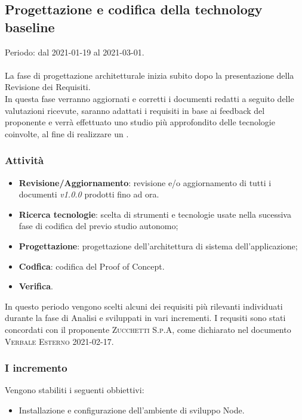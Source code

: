 \documentclass[../piano_di_progetto.tex]{subfiles}
\begin{document}
\subsection{Progettazione e codifica della technology baseline}
\label{sub:tech_baseline}
Periodo: dal 2021-01-19 al 2021-03-01. \\ \\
La fase di progettazione architetturale inizia subito dopo la presentazione della Revisione dei Requisiti.\\
In questa fase verranno aggiornati e corretti i documenti redatti a seguito delle valutazioni ricevute, saranno adattati i requisiti in base ai feedback del proponente e verrà effettuato uno studio più approfondito delle tecnologie coinvolte, al fine di realizzare un .

\subsubsection{Attività}
\begin{itemize}
    \item \textbf{Revisione/Aggiornamento}: revisione e/o aggiornamento di tutti i documenti \emph{v1.0.0} prodotti fino ad ora.
    \item \textbf{Ricerca tecnologie}: scelta di strumenti e tecnologie usate nella sucessiva fase di codifica del  previo studio autonomo;
    \item \textbf{Progettazione}: progettazione dell'architettura di sistema dell'applicazione;
    \item \textbf{Codfica}: codifica del Proof of Concept. 
    \item \textbf{Verifica}.\\
\end{itemize}
In questo periodo vengono scelti alcuni dei requisiti più rilevanti individuati durante la fase di Analisi e sviluppati in vari incrementi.
I requsiti sono stati concordati con il proponente \textsc{Zucchetti S.p.A}, come dichiarato nel documento \textsc{Verbale Esterno 2021-02-17}.%

\subsubsection{I incremento}
Vengono stabiliti i seguenti obbiettivi:
\begin{itemize}
    \item Installazione e configurazione dell'ambiente di sviluppo Node.
\end{itemize}
\end{document}
